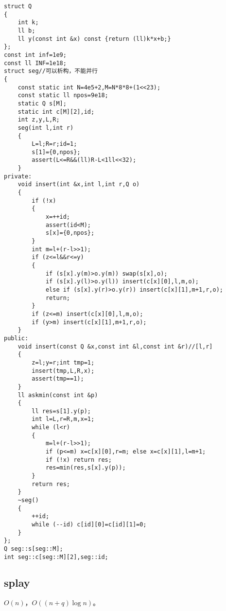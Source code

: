 \documentclass[12pt]{ctexart}
\begin{document}
\begin{lstlisting}
struct Q
{
	int k;
	ll b;
	ll y(const int &x) const {return (ll)k*x+b;}
};
const int inf=1e9;
const ll INF=1e18;
struct seg//可以析构，不能并行
{
	const static int N=4e5+2,M=N*8*8+(1<<23);
	const static ll npos=9e18;
	static Q s[M];
	static int c[M][2],id;
	int z,y,L,R;
	seg(int l,int r)
	{
		L=l;R=r;id=1;
		s[1]={0,npos};
		assert(L<=R&&(ll)R-L<1ll<<32);
	}
private:
	void insert(int &x,int l,int r,Q o)
	{
		if (!x)
		{
			x=++id;
			assert(id<M);
			s[x]={0,npos};
		}
		int m=l+(r-l>>1);
		if (z<=l&&r<=y)
		{
			if (s[x].y(m)>o.y(m)) swap(s[x],o);
			if (s[x].y(l)>o.y(l)) insert(c[x][0],l,m,o);
			else if (s[x].y(r)>o.y(r)) insert(c[x][1],m+1,r,o);
			return;
		}
		if (z<=m) insert(c[x][0],l,m,o);
		if (y>m) insert(c[x][1],m+1,r,o);
	}
public:
	void insert(const Q &x,const int &l,const int &r)//[l,r]
	{
		z=l;y=r;int tmp=1;
		insert(tmp,L,R,x);
		assert(tmp==1);
	}
	ll askmin(const int &p)
	{
		ll res=s[1].y(p);
		int l=L,r=R,m,x=1;
		while (l<r)
		{
			m=l+(r-l>>1);
			if (p<=m) x=c[x][0],r=m; else x=c[x][1],l=m+1;
			if (!x) return res;
			res=min(res,s[x].y(p));
		}
		return res;
	}
	~seg()
	{
		++id;
		while (--id) c[id][0]=c[id][1]=0;
	}
};
Q seg::s[seg::M];
int seg::c[seg::M][2],seg::id;
\end{lstlisting}

\subsection{splay}

$O(n)$，$O((n+q)\log n)$。
\end{document}
